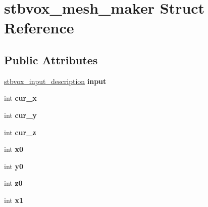 \hypertarget{structstbvox__mesh__maker}{}\section{stbvox\+\_\+mesh\+\_\+maker Struct Reference}
\label{structstbvox__mesh__maker}
\subsection*{Public Attributes}
\begin{DoxyCompactItemize}
\item 
\hyperlink{structstbvox__input__description}{stbvox\+\_\+input\+\_\+description} {\bfseries input}\hypertarget{structstbvox__mesh__maker_ae83f21625eef0fb8db4d55900b1e8d74}{}\label{structstbvox__mesh__maker_ae83f21625eef0fb8db4d55900b1e8d74}

\item 
int {\bfseries cur\+\_\+x}\hypertarget{structstbvox__mesh__maker_abe230177abc304df43d7ff13dd461531}{}\label{structstbvox__mesh__maker_abe230177abc304df43d7ff13dd461531}

\item 
int {\bfseries cur\+\_\+y}\hypertarget{structstbvox__mesh__maker_ace71843ec70b0cf42fb62103e81de058}{}\label{structstbvox__mesh__maker_ace71843ec70b0cf42fb62103e81de058}

\item 
int {\bfseries cur\+\_\+z}\hypertarget{structstbvox__mesh__maker_af93c69f827e26a599f8d1992a40cd681}{}\label{structstbvox__mesh__maker_af93c69f827e26a599f8d1992a40cd681}

\item 
int {\bfseries x0}\hypertarget{structstbvox__mesh__maker_adb193872685399d0140747b0239f1584}{}\label{structstbvox__mesh__maker_adb193872685399d0140747b0239f1584}

\item 
int {\bfseries y0}\hypertarget{structstbvox__mesh__maker_ac94bfce0e7ef578139ad8aa14566afa4}{}\label{structstbvox__mesh__maker_ac94bfce0e7ef578139ad8aa14566afa4}

\item 
int {\bfseries z0}\hypertarget{structstbvox__mesh__maker_a5a60460f25694ed512a63058f9d255b1}{}\label{structstbvox__mesh__maker_a5a60460f25694ed512a63058f9d255b1}

\item 
int {\bfseries x1}\hypertarget{structstbvox__mesh__maker_a420e37290433413010e23eb04ea5b3c9}{}\label{structstbvox__mesh__maker_a420e37290433413010e23eb04ea5b3c9}


\end{DoxyCompactItemize}
